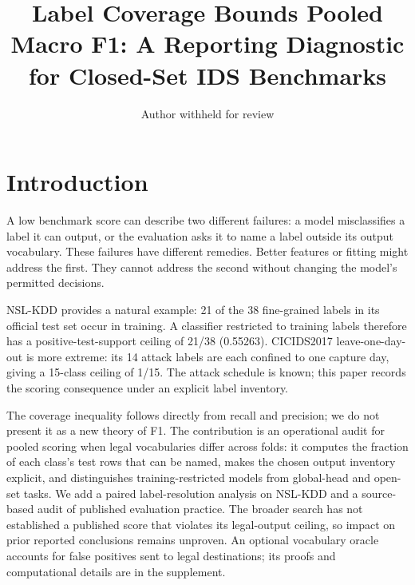 \documentclass[namedate,webpdf,contemporary,large]{TBench-template}
\begin{document}
\DOI{}
\title[Label coverage bounds]{Label Coverage Bounds Pooled Macro F1: A Reporting Diagnostic for Closed-Set IDS Benchmarks}
\author{Author withheld for review}
\maketitle

\section{Introduction}
A low benchmark score can describe two different failures: a model misclassifies a label it can output, or the evaluation asks it to name a label outside its output vocabulary. These failures have different remedies. Better features or fitting might address the first. They cannot address the second without changing the model's permitted decisions.

NSL-KDD provides a natural example: 21 of the 38 fine-grained labels in its official test set occur in training. A classifier restricted to training labels therefore has a positive-test-support ceiling of 21/38 (0.55263). CICIDS2017 leave-one-day-out is more extreme: its 14 attack labels are each confined to one capture day, giving a 15-class ceiling of 1/15. The attack schedule is known; this paper records the scoring consequence under an explicit label inventory.

The coverage inequality follows directly from recall and precision; we do not present it as a new theory of F1. The contribution is an operational audit for pooled scoring when legal vocabularies differ across folds: it computes the fraction of each class's test rows that can be named, makes the chosen output inventory explicit, and distinguishes training-restricted models from global-head and open-set tasks. We add a paired label-resolution analysis on NSL-KDD and a source-based audit of published evaluation practice. The broader search has not established a published score that violates its legal-output ceiling, so impact on prior reported conclusions remains unproven. An optional vocabulary oracle accounts for false positives sent to legal destinations; its proofs and computational details are in the supplement.
\end{document}
